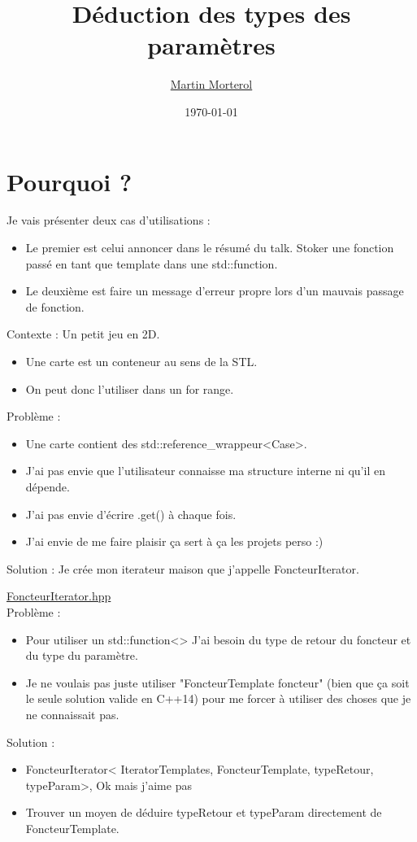 \documentclass{beamer}
\title{Déduction des types des paramètres}
\author{\url{Martin Morterol}}
\date{\today}
\begin{document}
\begin{frame}[plain]
\titlepage
\end{frame}

\section{Pourquoi ?}
\begin{frame}
	Je vais présenter deux cas d'utilisations : 
	\begin{itemize}
		\item Le premier est celui annoncer dans le résumé du talk. Stoker une fonction passé en tant que template dans une std::function.
		\item Le deuxième est faire un message d'erreur propre lors d'un mauvais passage de fonction.
	\end{itemize}
\end{frame}
\begin{frame}
	Contexte : Un petit jeu en 2D.
    \begin{itemize}
    	\item Une carte est un conteneur au sens de la STL.
    	\item On peut donc l'utiliser dans un for range.
    \end{itemize}
    Problème : 
    \begin{itemize}
    	\item Une carte contient des std::reference\_wrappeur<Case>.
    	\item J'ai pas envie que l'utilisateur connaisse ma structure interne ni qu'il en dépende.
    	\item J'ai pas envie d’écrire .get() à chaque fois. 
    	\item J'ai envie de me faire plaisir ça sert à ça les projets perso :)
    \end{itemize}
    Solution : Je crée mon iterateur maison que j'appelle FoncteurIterator.
    
\end{frame}

\begin{frame}
	\href{run:../code/src/iterateurFoncteur.hpp}{FoncteurIterator.hpp}\\
	Problème : 
	\begin{itemize}
		\item Pour utiliser un std::function<> J'ai besoin du type de retour du foncteur et du type du paramètre. 
		\item Je ne voulais pas juste utiliser "FoncteurTemplate foncteur" (bien que ça soit le seule solution valide en C++14) pour me forcer à utiliser des choses que je ne connaissait pas.
	\end{itemize}
	Solution :
	\begin{itemize}
		\item FoncteurIterator< IteratorTemplates, FoncteurTemplate, typeRetour, typeParam>, Ok mais j'aime pas 
		\item Trouver un moyen de déduire typeRetour et typeParam directement de FoncteurTemplate. 
	\end{itemize}
\end{frame}
\end{document}
